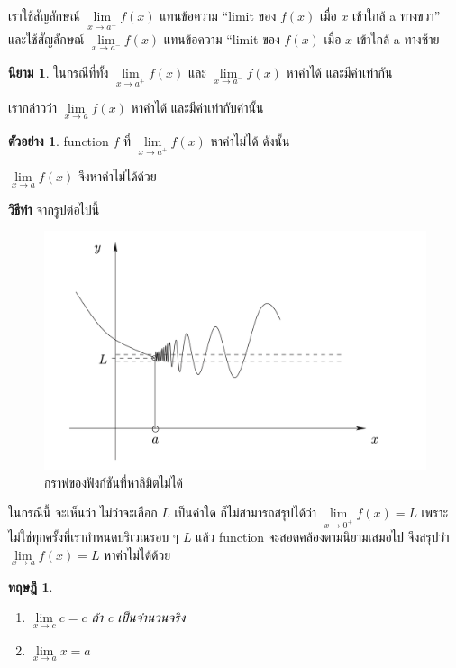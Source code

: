 \documentclass[
]{book}
\newtheorem{theorem}{ทฤษฎี}[chapter]
\theoremstyle{definition}
\newtheorem{definition}{นิยาม}[chapter]
\theoremstyle{definition}
\newtheorem{example}{ตัวอย่าง}[chapter]
\theoremstyle{definition}
\theoremstyle{definition}
\theoremstyle{remark}
\begin{document}
เราใช้สัญลักษณ์ \(\underset{x\rightarrow a^{+}}{\lim}f(x)\) แทนข้อความ ``limit
ของ \(f(x)\) เมื่อ \(x\) เข้าใกล้ a ทางขวา'' และใช้สัญลักษณ์
\(\underset{x\rightarrow a^{-}}{\lim}f(x)\) แทนข้อความ ``limit ของ \(f(x)\)
เมื่อ \(x\) เข้าใกล้ a ทางซ้าย

\begin{definition}
\protect\hypertarget{def:def-limit-2}{}\label{def:def-limit-2}ในกรณีที่ทั้ง \(\underset{x\rightarrow a^{+}}{\lim}f(x)\) และ
\(\underset{x\rightarrow a^{-}}{\lim}f(x)\) หาค่าได้ และมีค่าเท่ากัน

เรากล่าวว่า \(\underset{x\rightarrow a}{\lim}f(x)\) หาค่าได้ และมีค่าเท่ากับค่านั้น
\end{definition}

\begin{example}
\protect\hypertarget{exm:ex-limit-2}{}\label{exm:ex-limit-2}function \(f\) ที่ \(\underset{x\rightarrow a^{+}}{\lim}f(x)\) หาค่าไม่ได้ ดังนั้น

\(\underset{x\rightarrow a}{\lim}f(x)\) จึงหาค่าไม่ได้ด้วย
\end{example}

\textbf{วิธีทำ} จากรูปต่อไปนี้

\begin{figure}

{\centering \includegraphics[width=0.5\linewidth]{images/fig-limit-1} 

}

\caption{กราฟของฟังก์ชันที่หาลิมิตไม่ได้}\label{fig:fig-limit-1}
\end{figure}

ในกรณีนี้ จะเห็นว่า ไม่ว่าจะเลือก \(L\) เป็นค่าใด ก็ไม่สามารถสรุปได้ว่า
\(\underset{x\rightarrow 0^{+}}{\lim}f(x)=L\)
เพราะไม่ใช่ทุกครั้งที่เรากำหนดบริเวณรอบ ๆ \(L\) แล้ว function
จะสอดคล้องตามนิยามเสมอไป จึงสรุปว่า \(\underset{x\rightarrow a}{\lim}f(x)=L\)
หาค่าไม่ได้ด้วย

\begin{theorem}
\protect\hypertarget{thm:thm-limit-1}{}\label{thm:thm-limit-1}\leavevmode

\begin{enumerate}
\def\labelenumi{\arabic{enumi}.}
\item
  \(\underset{x\rightarrow c}{\lim}c=c\) ถ้า c เป็นจำนวนจริง
\item
  \(\underset{x\rightarrow a}{\lim}x=a\)
\end{enumerate}

\end{theorem}
\end{document}
